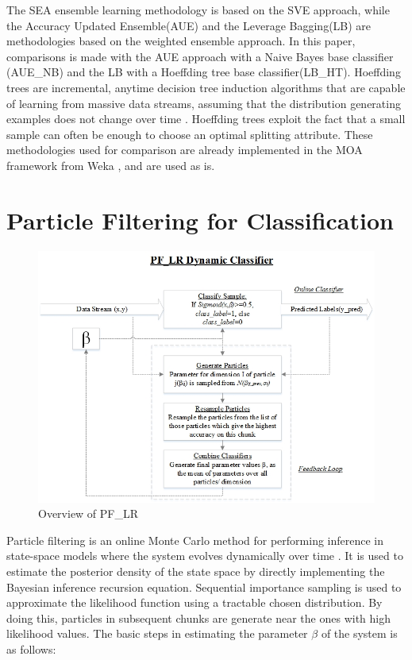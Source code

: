 \documentclass[conference]{IEEEtran}
\begin{document}
The SEA ensemble learning methodology \cite{Street and Kim(2001)} is based on the SVE approach, while the Accuracy Updated Ensemble(AUE) and the Leverage Bagging(LB) are methodologies based on the weighted ensemble approach. In this paper, comparisons is made with the AUE approach with a Naive Bayes base classifier (AUE\_NB) and the LB with a Hoeffding tree base classifier(LB\_HT). Hoeffding trees are incremental, anytime decision tree induction algorithms that are capable of learning from massive data streams, assuming that the distribution generating examples does not change over time \cite{Hoeglinger}. Hoeffding trees exploit the fact that a small sample can often be enough to choose an optimal splitting attribute. These methodologies used for comparison are already implemented in the MOA framework from Weka \cite{moa}, and are used as is. 


\section{Particle Filtering for Classification }

\begin{figure}
\captionsetup{justification=centering}
\centering
\includegraphics[scale=0.7]{fig/methodology.jpg}
\caption{Overview of PF\_LR }
\label{fig:blkoverall} 
\end{figure}

Particle filtering is an online Monte Carlo method for performing inference in state-space models where the system evolves dynamically over time \cite{Andrieu}. It is used to estimate the posterior density of the state space by directly implementing the Bayesian inference recursion equation. Sequential importance sampling is used to approximate the likelihood function using a tractable chosen distribution. By doing this, particles in subsequent chunks are generate near the ones with high likelihood values. The basic steps in estimating the parameter $\beta$ of the system is as follows:
\end{document}
